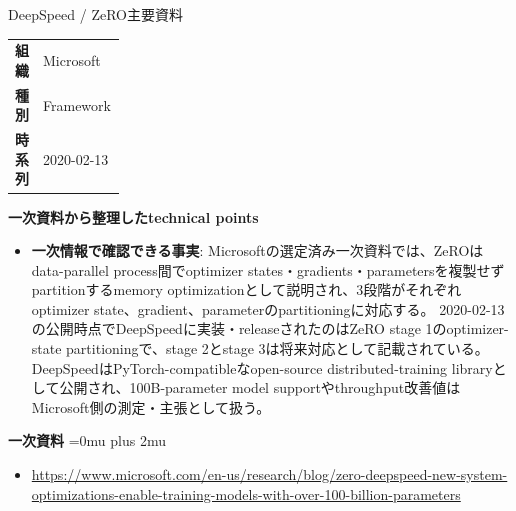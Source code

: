 \begin{technicalnote}{DeepSpeed / ZeRO}{主要資料}
\begingroup
\begin{tabularx}{\linewidth}{@{}>{\bfseries}p{0.22\linewidth}X@{}}
組織 & Microsoft \\
種別 & Framework \\
時系列 & 2020-02-13 \\
\end{tabularx}
\smallskip
\begin{minipage}{\linewidth}
{\bfseries 一次資料から整理したtechnical points}
\begin{itemize}[leftmargin=1.5em,itemsep=0.35em]
\item \textbf{一次情報で確認できる事実}: Microsoftの選定済み一次資料では、ZeROはdata-parallel process間でoptimizer states・gradients・parametersを複製せずpartitionするmemory optimizationとして説明され、3段階がそれぞれoptimizer state、gradient、parameterのpartitioningに対応する。 2020-02-13の公開時点でDeepSpeedに実装・releaseされたのはZeRO stage 1のoptimizer-state partitioningで、stage 2とstage 3は将来対応として記載されている。 DeepSpeedはPyTorch-compatibleなopen-source distributed-training libraryとして公開され、100B-parameter model supportやthroughput改善値はMicrosoft側の測定・主張として扱う。
\end{itemize}
\begin{samepage}
{\bfseries 一次資料}
\begingroup\sloppy
\Urlmuskip=0mu plus 2mu\relax
\begin{itemize}[leftmargin=1.5em,itemsep=0.25em]
\item {\scriptsize\url{https://www.microsoft.com/en-us/research/blog/zero-deepspeed-new-system-optimizations-enable-training-models-with-over-100-billion-parameters}}
\end{itemize}
\endgroup
\end{samepage}
\end{minipage}
\endgroup
\end{technicalnote}
\medskip

